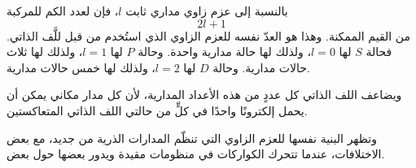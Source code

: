 \begin{classroomqa}
\end{classroomqa}

بالنسبة إلى عزم زاوي مداري ثابت \(l\)، فإن لعدد الكم للمركبة
\begin{equation}
2l+1
\end{equation}
من القيم الممكنة. وهذا هو العدّ نفسه للعزم الزاوي الذي استُخدم من قبل للَّف الذاتي. فحالة \(S\) لها \(l=0\)، ولذلك لها حالة مدارية واحدة. وحالة \(P\) لها \(l=1\)، ولذلك لها ثلاث حالات مدارية. وحالة \(D\) لها \(l=2\)، ولذلك لها خمس حالات مدارية.

ويضاعف اللف الذاتي كل عددٍ من هذه الأعداد المدارية، لأن كل مدار مكاني يمكن أن يحمل إلكترونًا واحدًا في كلٍّ من حالتي اللف الذاتي المتعاكستين.

\begin{classroomqa}
\end{classroomqa}

وتظهر البنية نفسها للعزم الزاوي التي تنظّم المدارات الذرية من جديد، مع بعض الاختلافات، عندما تتحرك الكواركات في منظومات مقيدة ويدور بعضها حول بعض.